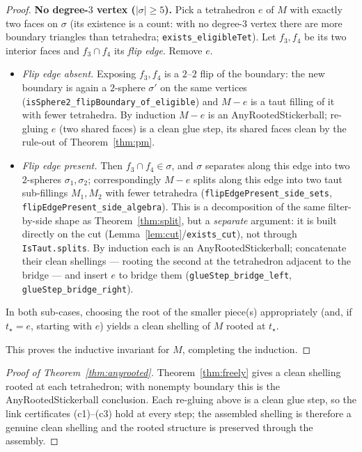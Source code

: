\documentclass[11pt]{article}
\theoremstyle{plain}
\theoremstyle{definition}
\theoremstyle{remark}
\newcommand{\code}[1]{\texttt{#1}}
\newcommand{\card}[1]{\lvert #1\rvert}
\begin{document}
\begin{proof}
\medskip
\noindent\textbf{No degree-$3$ vertex ($\card{\sigma}\ge 5$).} Pick a tetrahedron $e$ of $M$
with exactly two faces on $\sigma$ (its existence is a count: with no degree-$3$ vertex there
are more boundary triangles than tetrahedra; \code{exists\_eligibleTet}). Let $f_3,f_4$ be its
two interior faces and $f_3\cap f_4$ its \emph{flip edge}. Remove $e$.
\begin{itemize}
\item \emph{Flip edge absent.} Exposing $f_3,f_4$ is a $2$--$2$ flip of the boundary: the new
boundary is again a $2$-sphere $\sigma'$ on the same vertices
(\code{isSphere2\_flipBoundary\_of\_eligible}) and $M-e$ is a taut filling of it with fewer
tetrahedra. By induction $M-e$ is an AnyRootedStickerball; re-gluing $e$ (two shared faces)
is a clean glue step, its shared faces clean by the rule-out of Theorem~\ref{thm:pm}.
\item \emph{Flip edge present.} Then $f_3\cap f_4\in\sigma$, and $\sigma$ separates along this
edge into two $2$-spheres $\sigma_1,\sigma_2$; correspondingly $M-e$ splits along this edge into
two taut sub-fillings $M_1,M_2$ with fewer tetrahedra (\code{flipEdgePresent\_side\_sets},
\code{flipEdgePresent\_side\_algebra}). This is a decomposition of the same filter-by-side shape
as Theorem~\ref{thm:split}, but a \emph{separate} argument: it is built directly on the cut
(Lemma~\ref{lem:cut}/\code{exists\_cut}), not through \code{IsTaut.splits}.
By induction each is an AnyRootedStickerball; concatenate their clean shellings --- rooting
the second at the tetrahedron adjacent to the bridge --- and insert $e$ to bridge them
(\code{glueStep\_bridge\_left}, \code{glueStep\_bridge\_right}).
\end{itemize}
In both sub-cases, choosing the root of the smaller piece(s) appropriately (and, if
$t_\star=e$, starting with $e$) yields a clean shelling of $M$ rooted at $t_\star$.

\medskip
This proves the inductive invariant for $M$, completing the induction.
\end{proof}

\begin{proof}[Proof of Theorem~\ref{thm:anyrooted}]
Theorem~\ref{thm:freely} gives a clean shelling rooted at each tetrahedron; with nonempty
boundary this is the AnyRootedStickerball conclusion. Each re-gluing above is a clean glue
step, so the link certificates (c1)--(c3) hold at every step; the assembled shelling is
therefore a genuine clean shelling and the rooted structure is preserved through the
assembly.
\end{proof}
\end{document}
